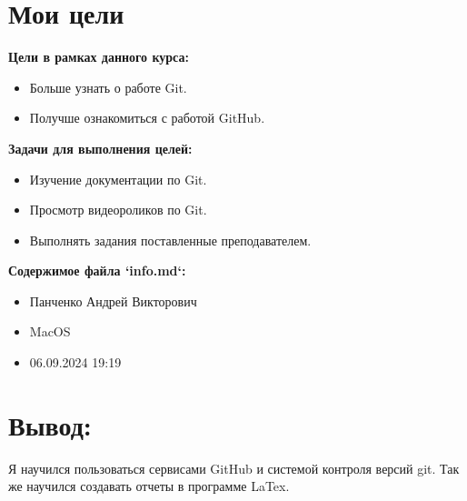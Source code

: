 \documentclass[12pt]{article}
\begin{document}
\section*{Мои цели}
\textbf{Цели в рамках данного курса:}
\begin{itemize}
    \item Больше узнать о работе Git.
    \item Получше ознакомиться с работой GitHub.
\end{itemize}

\textbf{Задачи для выполнения целей:}
\begin{itemize}
    \item Изучение документации по Git.
    \item Просмотр видеороликов по Git.
    \item Выполнять задания поставленные преподавателем.
\end{itemize}

\newpage

\noindent\textbf{Содержимое файла `info.md`:}

\begin{itemize}
    \item Панченко Андрей Викторович
    \item MacOS
    \item 06.09.2024 19:19
\end{itemize}

\newpage

\section*{Вывод:}
Я научился пользоваться сервисами GitHub и системой контроля версий git. Так же научился создавать отчеты в программе LaTex.
\end{document}
